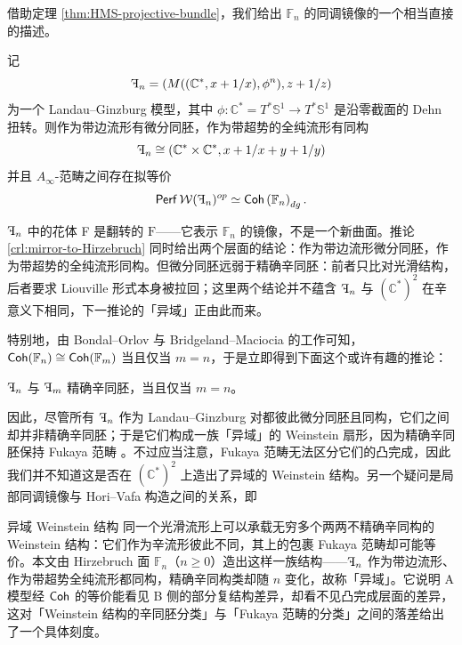 借助定理 \ref{thm:HMS-projective-bundle}，我们给出 $\mathbb{F}_n$ 的同调镜像的一个相当直接的描述。

\begin{crl}\label{crl:mirror-to-Hirzebruch}
    记 \[
        \rF_n =\left(M((\mathbb{C}^{\ast}, x+1/x),\phi^n),z+1/z\right)
    \]为一个 Landau--Ginzburg 模型，其中 $\phi\colon\mathbb{C}^{\ast}=T^{\ast}\mathbb{S}^1\to T^{\ast}\mathbb{S}^1$ 是沿零截面的 Dehn 扭转。则作为带边流形有微分同胚，作为带超势的全纯流形有同构 \[
        \rF_n\cong\left(\mathbb{C}^{\ast}\times\mathbb{C}^{\ast}, x+1/x+y+1/y\right)
    \]并且 $A_{\infty}$-范畴之间存在拟等价 \[
        \Perf\mathcal{W} (\rF_n)^{op}\simeq\Coh\left(\mathbb{F}_n\right)_{dg}.
    \]
\end{crl}

\begin{yizhu}
$\rF_n$ 中的花体 F 是翻转的 $\mathrm{F}$——它表示 $\mathbb{F}_n$ 的镜像，不是一个新曲面。推论 \ref{crl:mirror-to-Hirzebruch} 同时给出两个层面的结论：作为带边流形微分同胚，作为带超势的全纯流形同构。但微分同胚远弱于精确辛同胚：前者只比对光滑结构，后者要求 Liouville 形式本身被拉回；这里两个结论并不蕴含 $\rF_n$ 与 $\left(\mathbb{C}^{\ast}\right)^2$ 在辛意义下相同，下一推论的「异域」正由此而来。
\end{yizhu}

特别地，由 Bondal--Orlov \cite{BO01} 与 Bridgeland--Maciocia \cite{BM01} 的工作可知，$\operatorname{\mathsf{Coh}} (\mathbb{F}_n)\cong\operatorname{\mathsf{Coh}} (\mathbb{F}_m)$ 当且仅当 $m=n$，于是立即得到下面这个或许有趣的推论：

\begin{crl}\label{crl:exotic-Weinstein-structure}
    $\rF_n$ 与 $\rF_m$ 精确辛同胚，当且仅当 $m=n$。
\end{crl}

因此，尽管所有 $\rF_n$ 作为 Landau--Ginzburg 对都彼此微分同胚且同构，它们之间却并非精确辛同胚；于是它们构成一族「异域」的 Weinstein 扇形，因为精确辛同胚保持 Fukaya 范畴 \cite{HS26}。不过应当注意，Fukaya 范畴无法区分它们的凸完成，因此我们并不知道这是否在 $\left(\mathbb{C}^{\ast}\right)^2$ 上造出了异域的 Weinstein 结构。另一个疑问是局部同调镜像与 Hori--Vafa 构造之间的关系，即

\begin{conceptbox}{异域 Weinstein 结构}
同一个光滑流形上可以承载无穷多个两两不精确辛同构的 Weinstein 结构：它们作为辛流形彼此不同，其上的包裹 Fukaya 范畴却可能等价。本文由 Hirzebruch 面 $\mathbb{F}_n$（$n\ge 0$）造出这样一族结构——$\rF_n$ 作为带边流形、作为带超势全纯流形都同构，精确辛同构类却随 $n$ 变化，故称「异域」。它说明 A 模型经 $\operatorname{\mathsf{Coh}}$ 的等价能看见 B 侧的部分复结构差异，却看不见凸完成层面的差异，这对「Weinstein 结构的辛同胚分类」与「Fukaya 范畴的分类」之间的落差给出了一个具体刻度。
\par\smallskip{}
\end{conceptbox}

